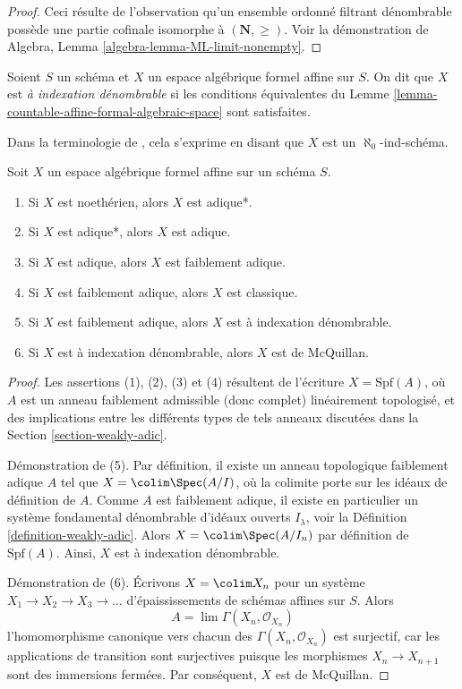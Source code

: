\begin{proof}
Ceci résulte de l'observation qu'un ensemble ordonné filtrant dénombrable
possède une partie cofinale isomorphe à $(\mathbf{N}, \geq)$.
Voir la démonstration de Algebra, Lemma \ref{algebra-lemma-ML-limit-nonempty}.
\end{proof}

\begin{definition}
\label{definition-countable}
Soient $S$ un schéma et $X$ un espace algébrique formel affine sur $S$.
On dit que $X$ est {\it à indexation dénombrable} si les conditions équivalentes du
Lemme \ref{lemma-countable-affine-formal-algebraic-space} sont satisfaites.
\end{definition}

\noindent
Dans la terminologie de \cite{BVGD}, cela s'exprime en disant que
$X$ est un $\aleph_0$-ind-schéma.

\begin{lemma}
\label{lemma-implications-between-types}
Soit $X$ un espace algébrique formel affine sur un schéma $S$.
\begin{enumerate}
\item Si $X$ est noethérien, alors $X$ est adique*.
\item Si $X$ est adique*, alors $X$ est adique.
\item Si $X$ est adique, alors $X$ est faiblement adique.
\item Si $X$ est faiblement adique, alors $X$ est classique.
\item Si $X$ est faiblement adique, alors $X$ est à indexation dénombrable.
\item Si $X$ est à indexation dénombrable, alors $X$ est de McQuillan.
\end{enumerate}
\end{lemma}

\begin{proof}
Les assertions (1), (2), (3) et (4) résultent de l'écriture $X = \text{Spf}(A)$,
où $A$ est un anneau faiblement admissible (donc complet) linéairement
topologisé, et des implications entre les différents
types de tels anneaux discutées dans la Section \ref{section-weakly-adic}.

\medskip\noindent
Démonstration de (5). Par définition, il existe un anneau topologique faiblement adique $A$
tel que $X = \colim \Spec(A/I)$, où la colimite porte sur les idéaux
de définition de $A$. Comme $A$ est faiblement adique, il existe en particulier
un système fondamental dénombrable d'idéaux ouverts $I_\lambda$, voir la
Définition \ref{definition-weakly-adic}.
Alors $X = \colim \Spec(A/I_n)$ par définition de $\text{Spf}(A)$.
Ainsi, $X$ est à indexation dénombrable.

\medskip\noindent
Démonstration de (6). Écrivons $X = \colim X_n$ pour un système
$X_1 \to X_2 \to X_3 \to \ldots$ d'épaississements de schémas
affines sur $S$. Alors
$$
A = \lim \Gamma(X_n, \mathcal{O}_{X_n})
$$
l'homomorphisme canonique vers chacun des $\Gamma(X_n, \mathcal{O}_{X_n})$ est surjectif, car les applications de transition
sont surjectives puisque les morphismes $X_n \to X_{n + 1}$ sont des immersions
fermées. Par conséquent, $X$ est de McQuillan.
\end{proof}


